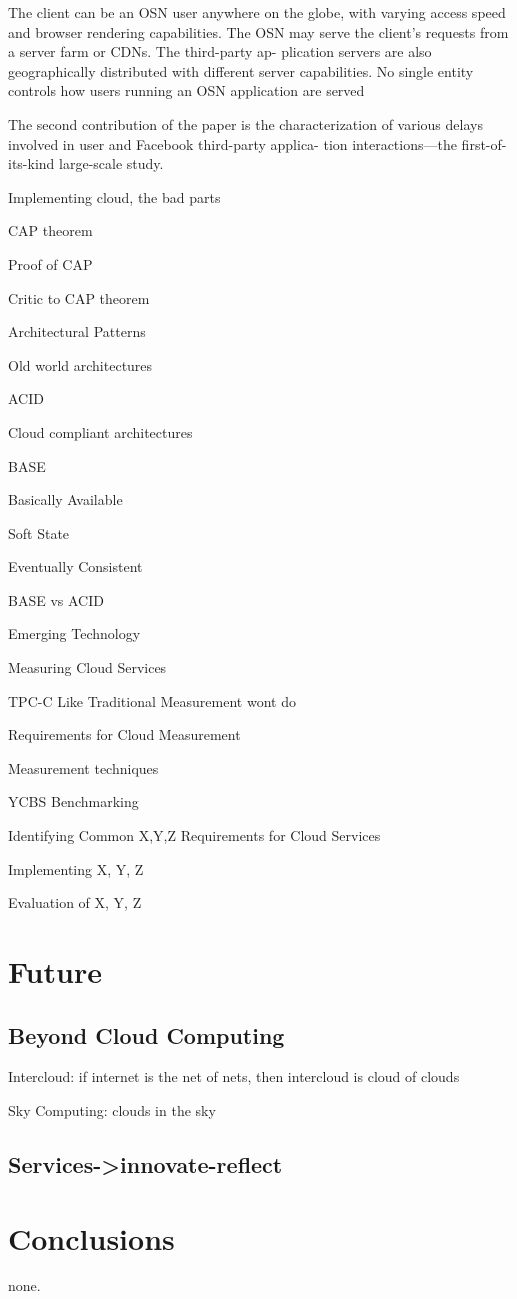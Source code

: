 \documentclass{tktltiki}
\begin{document}
The client can be an OSN user anywhere on the globe, with varying access speed and browser rendering capabilities. The OSN may serve the client’s requests from a server farm or CDNs. The third-party ap- plication servers are also geographically distributed with different server capabilities. No single entity controls how users running an OSN application are served

The second contribution of the paper is the characterization of
various delays involved in user and Facebook third-party applica- tion interactions—the first-of-its-kind large-scale study.





Implementing cloud, the bad parts

CAP theorem

Proof of CAP

Critic to CAP theorem

Architectural Patterns

Old world architectures

ACID

Cloud compliant architectures

BASE

Basically Available

Soft State

Eventually Consistent

BASE vs ACID

Emerging Technology

Measuring Cloud Services

TPC-C Like Traditional Measurement wont do

Requirements for Cloud Measurement

Measurement techniques

YCBS Benchmarking

Identifying Common X,Y,Z Requirements for Cloud Services

Implementing X, Y, Z

Evaluation of X, Y, Z




\section{Future}

\subsection{Beyond Cloud Computing}

Intercloud: if internet is the net of nets, then intercloud is cloud of clouds

Sky Computing: clouds in the sky

\subsection{Services->innovate-reflect}


\section{Conclusions}

none.




    
\end{document}
